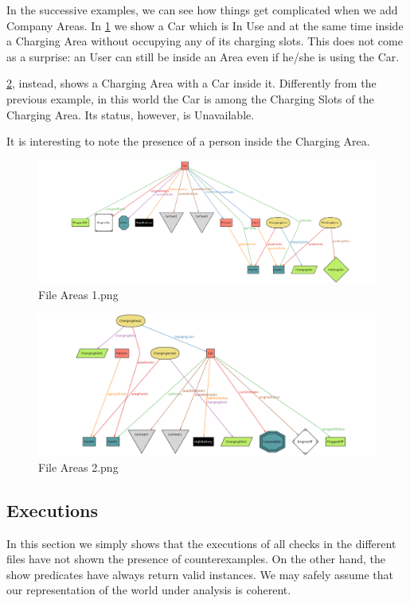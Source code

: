 In the successive examples, we can see how things get complicated when we add Company Areas. In \ref{fig:Area1} we show a Car which is In Use and at the same time inside a Charging Area without occupying any of its charging slots. This does not come as a surprise: an User can still be inside an Area even if he/she is using the Car.

\ref{fig:Area2}, instead, shows a Charging Area with a Car inside it. Differently from the previous example, in this world the Car is among the Charging Slots of the Charging Area. Its status, however, is Unavailable.

It is interesting to note the presence of a person inside the Charging Area.

\begin{figure}[!htbp]
\centering
\includegraphics[width=\linewidth,keepaspectratio]{../Alloy/Exported/Images/Areas_1.png}
\caption{File Areas 1.png}
\label{fig:Area1}
\end{figure}
\FloatBarrier

\FloatBarrier
\begin{figure}[!htbp]
\centering
\includegraphics[width=\linewidth,keepaspectratio]{../Alloy/Exported/Images/Areas_2.png}
\caption{File Areas 2.png}
\label{fig:Area2}
\end{figure}
\FloatBarrier

\subsection{Executions}
In this section we simply shows that the executions of all checks in the different files have not shown the presence of counterexamples. On the other hand, the show predicates have always return valid instances. We may safely assume that our representation of the world under analysis is coherent.

